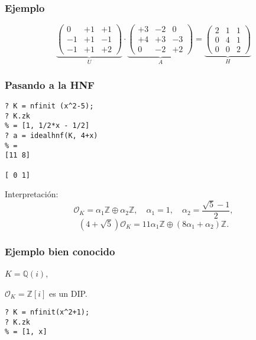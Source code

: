\documentclass{beamer}
\newcommand{\ZZ}{\mathbb{Z}}
\newcommand{\QQ}{\mathbb{Q}}
\renewcommand{\O}{\mathcal{O}}
\begin{document}
\begin{frame}
  \frametitle{Ejemplo}

  \[ \underbrace{\begin{pmatrix}
     0 & +1  & +1 \\
    -1 & +1 & -1 \\
    -1 & +1 & +2
  \end{pmatrix}}_U \cdot \underbrace{\begin{pmatrix}
      +3 & -2 &  0 \\
      +4 & +3 & -3 \\
       0 & -2 & +2
  \end{pmatrix}}_A = \underbrace{\begin{pmatrix}
      2 & 1 & 1 \\
      0 & 4 & 1 \\
      0 & 0 & 2
  \end{pmatrix}}_H \]

\end{frame}


\begin{frame}[fragile]
  \frametitle{Pasando a la HNF}

  \begin{shaded}\small
\begin{verbatim}
? K = nfinit (x^2-5);
? K.zk
% = [1, 1/2*x - 1/2]
? a = idealhnf(K, 4+x)
% =
[11 8]

[ 0 1]
\end{verbatim}
  \end{shaded}

  Interpretación:
  \[ \O_K = \alpha_1\ZZ \oplus \alpha_2\ZZ, \quad
     \alpha_1 = 1, \quad
     \alpha_2 = \frac{\sqrt{5} - 1}{2}, \]
  $$(4 + \sqrt{5})\O_K = 11\alpha_1\ZZ \oplus (8\alpha_1 + \alpha_2)\ZZ.$$
\end{frame}


\begin{frame}[fragile]
  \frametitle{Ejemplo bien conocido}

  $K = \QQ (i)$,

  $\O_K = \ZZ[i]$ es un DIP.

  \begin{shaded}\small
\begin{verbatim}
? K = nfinit(x^2+1);
? K.zk
% = [1, x]
\end{verbatim}
  \end{shaded}
\end{frame}
\end{document}
